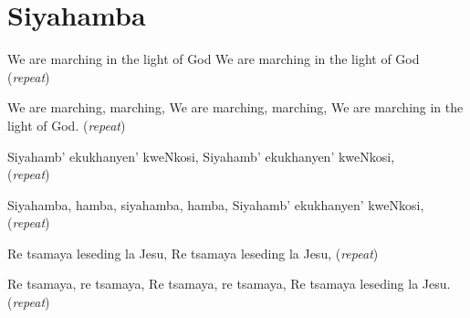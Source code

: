 \starttocol
\chapter{Siyahamba}
\nexttocol
\hfill{\it }
\stoptocol
\starttocol
\startlines
W{\sc e} are marching in the light of God
We are marching in the light of God
          \hfill({\it repeat})~~~~~~~~~

We are marching, marching,
We are marching, marching,
We are marching in the light of God.
          \hfill({\it repeat})~~~~~~~~~

Siyahamb' ekukhanyen' kweNkosi,
Siyahamb' ekukhanyen' kweNkosi,
          \hfill({\it repeat})~~~~~~~~~

Siyahamba, hamba, siyahamba, hamba,
Siyahamb' ekukhanyen' kweNkosi,
          \hfill({\it repeat})~~~~~~~~~

Re tsamaya leseding la Jesu,              
Re tsamaya leseding la Jesu, \hfill({\it repeat})~~~~~~~~~

Re tsamaya, re tsamaya,
Re tsamaya, re tsamaya,
Re tsamaya leseding la Jesu. \hfill({\it repeat})~~~~~~~~~
\stoplines
\nexttocol

\stoptocol
